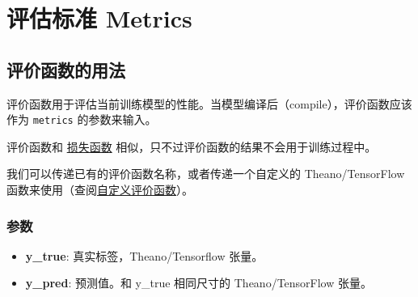 \section{评估标准 Metrics}
\subsection{评价函数的用法}\label{ux8bc4ux4ef7ux51fdux6570ux7684ux7528ux6cd5}

评价函数用于评估当前训练模型的性能。当模型编译后（compile），评价函数应该作为
\texttt{metrics} 的参数来输入。

\begin{Shaded}
\begin{Highlighting}[]
\OperatorTok{=}\NormalTok{,}
              \OperatorTok{=}\NormalTok{,}
              \OperatorTok{=}\NormalTok{[}\NormalTok{, }\NormalTok{])}
\end{Highlighting}
\end{Shaded}

\begin{Shaded}
\begin{Highlighting}[]
  

\OperatorTok{=}\NormalTok{,}
              \OperatorTok{=}\NormalTok{,}
              \OperatorTok{=}
\end{Highlighting}
\end{Shaded}

评价函数和 \hyperref[losses]{损失函数}
相似，只不过评价函数的结果不会用于训练过程中。

我们可以传递已有的评价函数名称，或者传递一个自定义的 Theano/TensorFlow
函数来使用（查阅\hyperref[custom-metrics]{自定义评价函数}）。

\subsubsection{参数}\label{ux53c2ux6570}

\begin{itemize}
\tightlist
\item
  \textbf{y\_true}: 真实标签，Theano/Tensorflow 张量。
\item
  \textbf{y\_pred}: 预测值。和 y\_true 相同尺寸的 Theano/TensorFlow
  张量。
\end{itemize}

